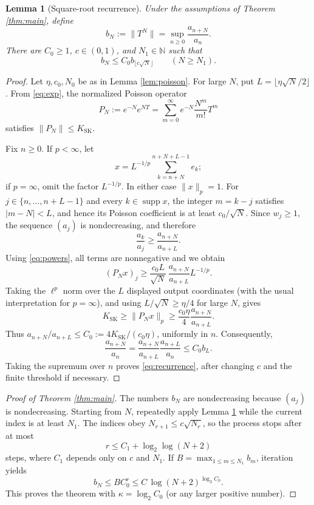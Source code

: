 \documentclass[11pt]{article}
\newtheorem{lemma}[theorem]{Lemma}
\newcommand{\N}{\mathbb N}
\newcommand{\K}{K_{\mathrm{SK}}}
\DeclareMathOperator{\supp}{supp}
\begin{document}
\begin{lemma}[Square-root recurrence]\label{lem:recurrence}
Under the assumptions of Theorem \ref{thm:main}, define
\[
  b_N:=\|T^N\|=\sup_{n\ge0}\frac{a_{n+N}}{a_n}.
\]
There are $C_0\ge1$, $c\in(0,1)$, and $N_1\in\N$ such that
\begin{equation}\label{eq:recurrence}
  b_N\le C_0 b_{\lfloor c\sqrt N\rfloor}\qquad(N\ge N_1).
\end{equation}
\end{lemma}

\begin{proof}
Let $\eta,c_0,N_0$ be as in Lemma \ref{lem:poisson}.  For large $N$, put
$L=\lfloor\eta\sqrt N/2\rfloor$.  From \eqref{eq:exp}, the normalized
Poisson operator
\[
  P_N:=e^{-N}e^{NT}
       =\sum_{m=0}^\infty e^{-N}\frac{N^m}{m!}T^m
\]
satisfies $\|P_N\|\le\K$.

Fix $n\ge0$.  If $p<\infty$, let
\[
 x=L^{-1/p}\sum_{k=n+N}^{n+N+L-1}e_k;
\]
if $p=\infty$, omit the factor $L^{-1/p}$.  In either case $\|x\|_p=1$.
For $j\in\{n,\ldots,n+L-1\}$ and every
$k\in\supp x$, the integer $m=k-j$ satisfies $|m-N|<L$, and hence its
Poisson coefficient is at least $c_0/\sqrt N$.  Since $w_j\ge1$, the sequence
$(a_j)$ is nondecreasing, and therefore
\[
 \frac{a_k}{a_j}\ge\frac{a_{n+N}}{a_{n+L}}.
\]
Using \eqref{eq:powers}, all terms are nonnegative and we obtain
\[
 (P_Nx)_j
 \ge \frac{c_0L}{\sqrt N}\,
      \frac{a_{n+N}}{a_{n+L}}L^{-1/p}.
\]
Taking the $\ell^p$ norm over the $L$ displayed output coordinates (with the
usual interpretation for $p=\infty$), and using $L/\sqrt N\ge\eta/4$ for
large $N$, gives
\[
 \K\ge\|P_Nx\|_p
 \ge \frac{c_0\eta}{4}\frac{a_{n+N}}{a_{n+L}}.
\]
Thus $a_{n+N}/a_{n+L}\le C_0:=4\K/(c_0\eta)$, uniformly in $n$.  Consequently,
\[
 \frac{a_{n+N}}{a_n}
 =\frac{a_{n+N}}{a_{n+L}}\frac{a_{n+L}}{a_n}
 \le C_0 b_L.
\]
Taking the supremum over $n$ proves \eqref{eq:recurrence}, after changing
$c$ and the finite threshold if necessary.
\end{proof}

\begin{proof}[Proof of Theorem \ref{thm:main}]
The numbers $b_N$ are nondecreasing because $(a_j)$ is nondecreasing.  Starting
from $N$, repeatedly apply Lemma \ref{lem:recurrence} while the current index
is at least $N_1$.  The indices obey $N_{r+1}\le c\sqrt{N_r}$, so the process
stops after at most
\[
  r\le C_1+\log_2\log(N+2)
\]
steps, where $C_1$ depends only on $c$ and $N_1$.  If
$B=\max_{1\le m\le N_1}b_m$, iteration yields
\[
 b_N\le B C_0^r
 \le C\,\log(N+2)^{\log_2 C_0}.
\]
This proves the theorem with $\kappa=\log_2 C_0$ (or any larger positive
number).
\end{proof}
\end{document}
